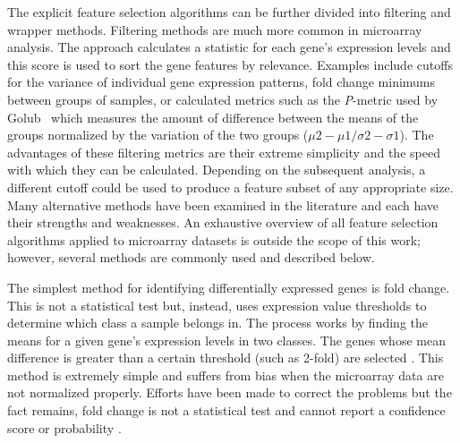 The explicit feature selection algorithms can be further divided into filtering
and wrapper methods. Filtering methods are much more common in microarray
analysis. The approach calculates a statistic for each gene's expression levels
and this score is used to sort the gene features by relevance.  Examples
include cutoffs for the variance of individual gene expression patterns, fold
change minimums between groups of samples, or calculated metrics such as the
\emph{P}-metric used by Golub \ea\ which measures the amount of difference
between the means of the groups normalized by the variation of the two groups
($\mu2 - \mu1 / \sigma2 - \sigma1$). The advantages of these filtering metrics
are their extreme simplicity and the speed with which they can be calculated.
Depending on the subsequent analysis, a different cutoff could be used to
produce a feature subset of any appropriate size.  Many alternative methods
have been examined in the literature and each have their strengths and
weaknesses.  An exhaustive overview of all feature selection algorithms applied
to microarray datasets is outside the scope of this work; however, several
methods are commonly used and described below. 






The simplest method for identifying differentially expressed genes is fold
change.  This is not a statistical test but, instead, uses expression value
thresholds to determine which class a sample belongs in.  The process works by
finding the means for a given gene's expression levels in two classes. The
genes whose mean difference is greater than a certain threshold (such as
2-fold) are selected \cite{derisi1997ema}.  This method is extremely simple and
suffers from bias when the microarray data are not normalized properly.
Efforts have been made to correct the problems but the fact remains, fold
change is not a statistical test and cannot report a confidence score or
probability \cite{yang2002wfa}.


